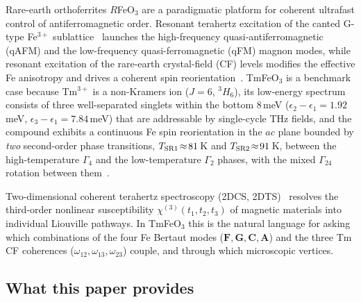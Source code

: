 \documentclass[reprint,amsmath,amssymb,aps,prb,longbibliography]{revtex4-2}
\newcommand{\bfF}{\mathbf{F}}
\newcommand{\bfG}{\mathbf{G}}
\newcommand{\bfA}{\mathbf{A}}
\newcommand{\bfC}{\mathbf{C}}
\begin{document}
Rare-earth orthoferrites $R$FeO$_3$ are a paradigmatic platform for
coherent ultrafast control of antiferromagnetic order. Resonant terahertz
excitation of the canted G-type Fe$^{3+}$ sublattice~\cite{Kimel2004,Kimel2005}
launches the high-frequency quasi-antiferromagnetic (qAFM) and the
low-frequency quasi-ferromagnetic (qFM) magnon modes, while resonant
excitation of the rare-earth crystal-field (CF) levels modifies the
effective Fe anisotropy and drives a coherent spin
reorientation~\cite{Baierl2016,Schlauderer2019,Mashkovich2021}. TmFeO$_3$
is a benchmark case because Tm$^{3+}$ is a non-Kramers ion ($J=6$, $^3H_6$),
its low-energy spectrum consists of three well-separated singlets within
the bottom 8\,meV
($\epsilon_2-\epsilon_1=1.92$\,meV, $\epsilon_3-\epsilon_1=7.84$\,meV)
that are addressable by single-cycle THz fields, and the compound exhibits
a continuous Fe spin reorientation in the $ac$ plane bounded by
\emph{two} second-order phase transitions, $T_{\rm SR1}\!\approx\!81$\,K and
$T_{\rm SR2}\!\approx\!91$\,K, between the high-temperature $\Gamma_4$ and
the low-temperature $\Gamma_2$ phases, with the mixed
$\Gamma_{24}$ rotation between them~\cite{LeendersHerrmann1971,
ShapiroAxeBirgeneau1974,Belov1976,Yamaguchi1974,Schlauderer2019}.

Two-dimensional coherent terahertz spectroscopy (2DCS,
2DTS)~\cite{LuJonas2017,WanArmitage2019,MahmoodWan2021,LiNorrisHuber2022,
HuberPRX2024} resolves the third-order nonlinear susceptibility
$\chi^{(3)}(t_1,t_2,t_3)$ of magnetic materials into individual Liouville
pathways. In TmFeO$_3$ this is the natural language for asking which
combinations of the four Fe Bertaut modes ($\bfF,\bfG,\bfC,\bfA$) and the
three Tm CF coherences ($\omega_{12},\omega_{13},\omega_{23}$) couple,
and through which microscopic vertices.

\subsection{What this paper provides}
\end{document}

